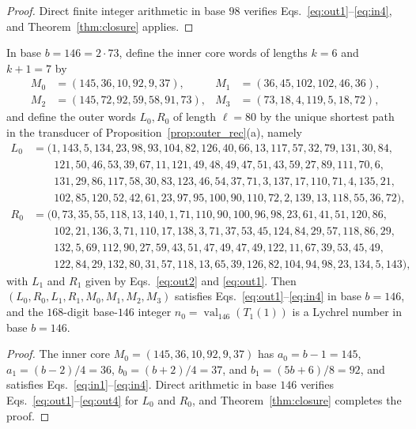 \documentclass[12pt,reqno]{article}
\DeclareMathOperator{\val}{val}
\begin{document}
\begin{proof}
Direct finite integer arithmetic in base $98$ verifies Eqs.~\eqref{eq:out1}--\eqref{eq:in4}, and Theorem~\ref{thm:closure} applies.
\end{proof}

\begin{theorem}\label{thm:b146}
In base $b = 146 = 2 \cdot 73$, define the inner core words of lengths $k = 6$ and $k+1 = 7$ by
\begin{align*}
M_0 &= (145, 36, 10, 92, 9, 37), & M_1 &= (36, 45, 102, 102, 46, 36),\\
M_2 &= (145, 72, 92, 59, 58, 91, 73), & M_3 &= (73, 18, 4, 119, 5, 18, 72),
\end{align*}
and define the outer words $L_0, R_0$ of length $\ell = 80$ by the unique shortest path in the transducer of Proposition~\ref{prop:outer_rec}(a), namely
\begin{align*}
L_0 &= (1, 143, 5, 134, 23, 98, 93, 104, 82, 126, 40, 66, 13, 117, 57, 32, 79, 131, 30, 84,\\
&\phantom{=\ (} 121, 50, 46, 53, 39, 67, 11, 121, 49, 48, 49, 47, 51, 43, 59, 27, 89, 111, 70, 6,\\
&\phantom{=\ (} 131, 29, 86, 117, 58, 30, 83, 123, 46, 54, 37, 71, 3, 137, 17, 110, 71, 4, 135, 21,\\
&\phantom{=\ (} 102, 85, 120, 52, 42, 61, 23, 97, 95, 100, 90, 110, 72, 2, 139, 13, 118, 55, 36, 72),\\
R_0 &= (0, 73, 35, 55, 118, 13, 140, 1, 71, 110, 90, 100, 96, 98, 23, 61, 41, 51, 120, 86,\\
&\phantom{=\ (} 102, 21, 136, 3, 71, 110, 17, 138, 3, 71, 37, 53, 45, 124, 84, 29, 57, 118, 86, 29,\\
&\phantom{=\ (} 132, 5, 69, 112, 90, 27, 59, 43, 51, 47, 49, 47, 49, 122, 11, 67, 39, 53, 45, 49,\\
&\phantom{=\ (} 122, 84, 29, 132, 80, 31, 57, 118, 13, 65, 39, 126, 82, 104, 94, 98, 23, 134, 5, 143),
\end{align*}
with $L_1$ and $R_1$ given by Eqs.~\eqref{eq:out2} and \eqref{eq:out1}. Then $(L_0, R_0, L_1, R_1, M_0, M_1, M_2, M_3)$ satisfies Eqs.~\eqref{eq:out1}--\eqref{eq:in4} in base $b = 146$, and the $168$-digit base-$146$ integer $n_0 = \val_{146}(T_1(1))$ is a Lychrel number in base $b = 146$.
\end{theorem}

\begin{proof}
The inner core $M_0 = (145, 36, 10, 92, 9, 37)$ has $a_0 = b-1 = 145$, $a_1 = (b-2)/4 = 36$, $b_0 = (b+2)/4 = 37$, and $b_1 = (5b+6)/8 = 92$, and satisfies Eqs.~\eqref{eq:in1}--\eqref{eq:in4}. Direct arithmetic in base $146$ verifies Eqs.~\eqref{eq:out1}--\eqref{eq:out4} for $L_0$ and $R_0$, and Theorem~\ref{thm:closure} completes the proof.
\end{proof}
\end{document}
